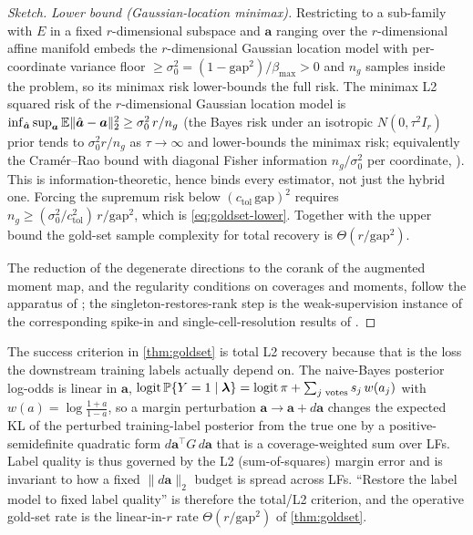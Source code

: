 \begin{proof}[Sketch]
\emph{Lower bound (Gaussian-location minimax).} Restricting to a
sub-family with $E$ in a fixed $r$-dimensional subspace and $\bm{a}$
ranging over the $r$-dimensional affine manifold embeds the
$r$-dimensional Gaussian location model with per-coordinate variance
floor $\ge \sigma_0^2 = (1 - \mathrm{gap}^2)/\beta_{\max} > 0$ and $n_g$
samples inside the problem, so its minimax risk lower-bounds the full
risk. The minimax L2 squared risk of the $r$-dimensional Gaussian
location model is $\inf_{\hat{\bm{a}}}\sup_{\bm{a}} \mathbb{E}\|\hat{\bm{a}} -
\bm{a}\|_2^2 \ge \sigma_0^2\, r/n_g$ (the Bayes risk under an isotropic
$N(0, \tau^2 I_r)$ prior tends to $\sigma_0^2 r/n_g$ as $\tau \to \infty$
and lower-bounds the minimax risk; equivalently the Cram\'er--Rao bound
with diagonal Fisher information $n_g/\sigma_0^2$ per coordinate,
\citealp{vandervaart1998asymptotic}).
This is information-theoretic, hence binds every estimator, not just the
hybrid one. Forcing the supremum risk below $(c_{\mathrm{tol}}\,\mathrm{gap})^2$
requires $n_g \ge (\sigma_0^2/c_{\mathrm{tol}}^2)\, r/\mathrm{gap}^2$, which is
\eqref{eq:goldset-lower}. Together with the upper bound the gold-set
sample complexity for total recovery is $\Theta(r/\mathrm{gap}^2)$.

The reduction of the degenerate directions to the corank of the
augmented moment map, and the regularity conditions on coverages and
moments, follow the apparatus of \citet[\S 7]{towell2026masked}; the
singleton-restores-rank step is the weak-supervision instance of the
corresponding spike-in and single-cell-resolution results of
\citet{towell2026scrnacoarsening,towell2026spatialcoarsening}.
\end{proof}

\begin{remark}
\label{rmk:l2-loss}
The success criterion in \cref{thm:goldset} is total L2 recovery
because that is the loss the downstream training labels actually
depend on. The naive-Bayes posterior log-odds is linear in $\bm{a}$,
$\mathrm{logit}\,\mathbb{P}\{Y = 1 \mid \bm\lambda\} = \mathrm{logit}\,\pi
+ \sum_{j\text{ votes}} s_j\, w(a_j)$ with $w(a) = \log\frac{1+a}{1-a}$,
so a margin perturbation $\bm{a} \to \bm{a} + d\bm{a}$ changes the
expected KL of the perturbed training-label posterior from the true one
by a positive-semidefinite quadratic form $d\bm{a}^\top G\, d\bm{a}$
that is a coverage-weighted sum over LFs. Label quality is thus governed
by the L2 (sum-of-squares) margin error and is invariant to how a fixed
$\|d\bm{a}\|_2$ budget is spread across LFs. ``Restore the label model
to fixed label quality'' is therefore the total/L2 criterion, and the
operative gold-set rate is the linear-in-$r$ rate
$\Theta(r/\mathrm{gap}^2)$ of \cref{thm:goldset}.
\end{remark}

